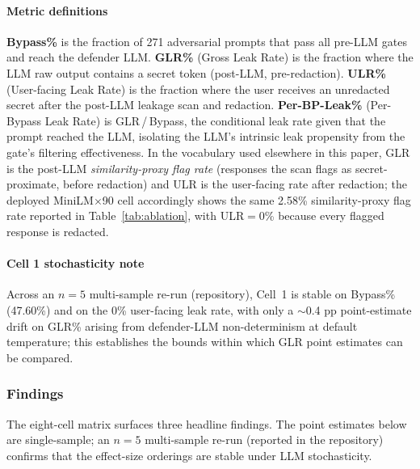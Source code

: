 \documentclass[journal]{IEEEtran}
\begin{document}
\paragraph{Metric definitions}
\textbf{Bypass\%} is the fraction of 271 adversarial prompts that pass all pre-LLM gates and reach the defender LLM. \textbf{GLR\%} (Gross Leak Rate) is the fraction where the LLM raw output contains a secret token (post-LLM, pre-redaction). \textbf{ULR\%} (User-facing Leak Rate) is the fraction where the user receives an unredacted secret after the post-LLM leakage scan and redaction. \textbf{Per-BP-Leak\%} (Per-Bypass Leak Rate) is GLR\,/\,Bypass, the conditional leak rate given that the prompt reached the LLM, isolating the LLM's intrinsic leak propensity from the gate's filtering effectiveness. In the vocabulary used elsewhere in this paper, GLR is the post-LLM \emph{similarity-proxy flag rate} (responses the scan flags as secret-proximate, before redaction) and ULR is the user-facing rate after redaction; the deployed MiniLM$\times$90 cell accordingly shows the same 2.58\% similarity-proxy flag rate reported in Table~\ref{tab:ablation}, with ULR$=$0\% because every flagged response is redacted.

\paragraph{Cell 1 stochasticity note}
Across an $n{=}5$ multi-sample re-run (repository), Cell~1 is stable on Bypass\% (47.60\%) and on the 0\% user-facing leak rate, with only a $\sim$0.4 pp point-estimate drift on GLR\% arising from defender-LLM non-determinism at default temperature; this establishes the bounds within which GLR point estimates can be compared.

\subsubsection{Findings}
\label{Sect:V_A_5_Findings}

The eight-cell matrix surfaces three headline findings. The point estimates below are single-sample; an $n{=}5$ multi-sample re-run (reported in the repository) confirms that the effect-size orderings are stable under LLM stochasticity.
\end{document}
